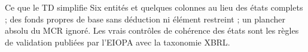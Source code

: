 \documentclass[11pt,a4paper]{article}
\begin{document}
\begin{generalisation}{Ce que le TD simplifie}
Six entités et quelques colonnes au lieu des états complets ; des fonds propres de base sans
déduction ni élément restreint ; un plancher absolu du MCR ignoré. Les vrais contrôles de cohérence
des états sont les règles de validation publiées par l'EIOPA avec la taxonomie XBRL.
\end{generalisation}
\end{document}
